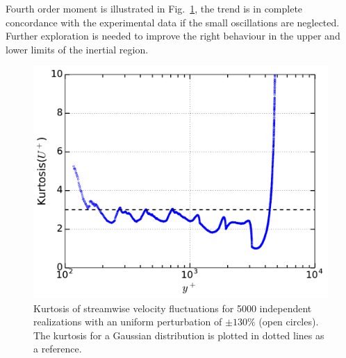 \documentclass[aps,reprint,amsmath,amssymb,pra]{revtex4-1}%
\begin{document}
Fourth order moment is illustrated in Fig.~\ref{fig:kurtun130}, the trend is in complete concordance with the experimental data if the small oscillations are neglected. Further exploration is needed to improve the right behaviour in the upper and lower limits of the inertial region.
\begin{figure}[tb] 
\includegraphics[scale=0.46]{figures/kurtosis_5000_assembles_un130}
\caption{\label{fig:kurtun130} Kurtosis of streamwise velocity fluctuations for 5000 independent realizations with an uniform perturbation of $\pm 130\%$ (open circles). The kurtosis for a Gaussian distribution is plotted in dotted lines as a reference.} 
\end{figure}


\end{document}
